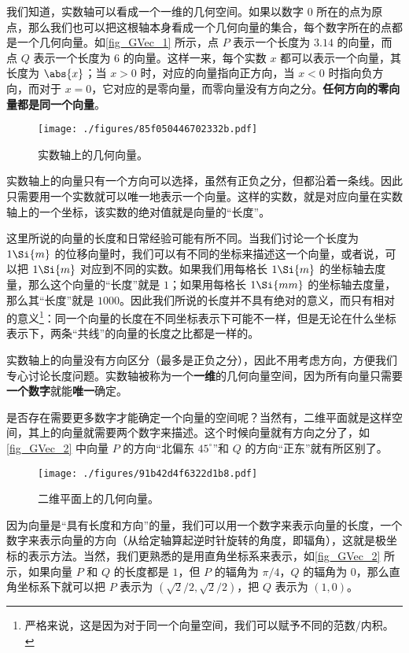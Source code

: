 我们知道，实数轴可以看成一个一维的几何空间。如果以数字 $0$ 所在的点为原点，那么我们也可以把这根轴本身看成一个几何向量的集合，每个数字所在的点都是一个几何向量。如\autoref{fig_GVec_1} 所示，点 $P$ 表示一个长度为 $3.14$ 的向量，而点 $Q$ 表示一个长度为 $6$ 的向量。这样一来，每个实数 $x$ 都可以表示一个向量，其长度为 $\abs{x}$；当 $x>0$ 时，对应的向量指向正方向，当 $x<0$ 时指向负方向，而对于 $x=0$，它对应的是零向量，而零向量没有方向之分。\textbf{任何方向的零向量都是同一个向量}。

\begin{figure}[ht]
\centering
\texttt{[image: ./figures/85f050446702332b.pdf]}
\caption{实数轴上的几何向量。} \label{fig_GVec_1}
\end{figure}

实数轴上的向量只有一个方向可以选择，虽然有正负之分，但都沿着一条线。因此只需要用一个实数就可以唯一地表示一个向量。这样的实数，就是对应向量在实数轴上的一个坐标，该实数的绝对值就是向量的“长度”。


这里所说的向量的长度和日常经验可能有所不同。当我们讨论一个长度为 $1\Si{m}$ 的位移向量时，我们可以有不同的坐标来描述这一个向量，或者说，可以把 $1\Si{m}$ 对应到不同的实数。如果我们用每格长 $1\Si{m}$ 的坐标轴去度量，那么这个向量的“长度”就是 $1$；如果用每格长 $1\Si{mm}$ 的坐标轴去度量，那么其“长度”就是 $1000$。因此我们所说的长度并不具有绝对的意义，而只有相对的意义\footnote{严格来说，这是因为对于同一个向量空间，我们可以赋予不同的范数/内积。}：同一个向量的长度在不同坐标表示下可能不一样，但是无论在什么坐标表示下，两条“共线”的向量的长度之比都是一样的。


实数轴上的向量没有方向区分（最多是正负之分），因此不用考虑方向，方便我们专心讨论长度问题。实数轴被称为一个\textbf{一维}的几何向量空间，因为所有向量只需要\textbf{一个数字}就能\textbf{唯一}确定。

是否存在需要更多数字才能确定一个向量的空间呢？当然有，二维平面就是这样空间，其上的向量就需要两个数字来描述。这个时候向量就有方向之分了，如\autoref{fig_GVec_2} 中向量 $P$ 的方向“北偏东 $45^\circ$”和 $Q$ 的方向“正东”就有所区别了。

\begin{figure}[ht]
\centering
\texttt{[image: ./figures/91b42d4f6322d1b8.pdf]}
\caption{二维平面上的几何向量。} \label{fig_GVec_2}
\end{figure}

因为向量是“具有长度和方向”的量，我们可以用一个数字来表示向量的长度，一个数字来表示向量的方向（从给定轴算起逆时针旋转的角度，即辐角），这就是极坐标的表示方法。当然，我们更熟悉的是用直角坐标系来表示，如\autoref{fig_GVec_2} 所示，如果向量 $P$ 和 $Q$ 的长度都是 $1$，但 $P$ 的辐角为 $\pi/4$，$Q$ 的辐角为 $0$，那么直角坐标系下就可以把 $P$ 表示为 $(\sqrt{2}/2, \sqrt{2}/2)$，把 $Q$ 表示为 $(1, 0)$。

